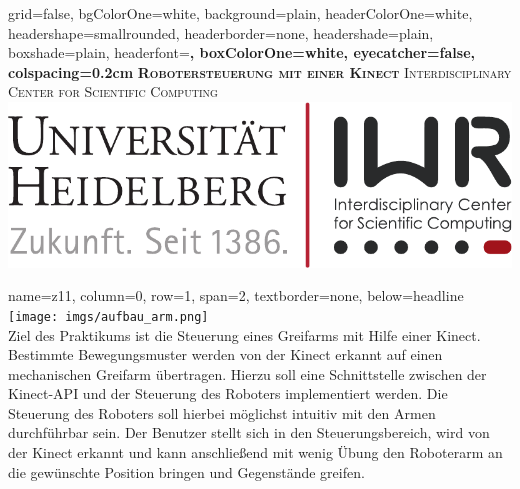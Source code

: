 \documentclass[portrait,a0paper]{baposter}
\begin{document}
\begin{poster}
  {
  grid=false,
  bgColorOne=white,
  background=plain,
  headerColorOne=white,
  headershape=smallrounded,
  headerborder=none,
  headershade=plain,
  boxshade=plain,
  headerfont=\Large\bf\textsf,
  boxColorOne=white,
  eyecatcher=false,
  colspacing=0.2cm
  }
  { } 
 {\bf\textsc{Robotersteuerung mit einer Kinect}\vspace{0.5em}}
  {
  \textsc{Interdisciplinary Center for Scientific Computing}  \vspace*{0.5em} \\

  }
  {%
    \includegraphics[scale=0.5]{imgs/IWR_Logo.pdf}
  }
 
 
    {
    name=z11,
    column=0,
    row=1,
    span=2,
    textborder=none,
    below=headline
    }
    {
    \texttt{[image: imgs/aufbau\_arm.png]}\\
Ziel des Praktikums ist die Steuerung eines Greifarms mit Hilfe einer Kinect.
Bestimmte Bewegungsmuster werden von der Kinect erkannt auf einen mechanischen Greifarm übertragen.
Hierzu soll eine Schnittstelle zwischen der Kinect-API und der Steuerung des Roboters implementiert werden.
Die Steuerung des Roboters soll hierbei möglichst intuitiv mit den Armen durchführbar sein.
Der Benutzer stellt sich in den Steuerungsbereich, wird von der Kinect erkannt und kann anschließend mit wenig Übung den Roboterarm an die gewünschte Position bringen und Gegenstände greifen.
 }


\end{poster}
\end{document}
